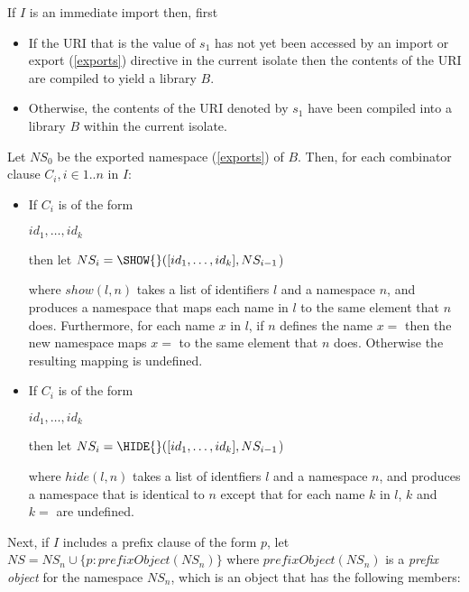 \documentclass{article}
\newcommand{\code}[1]{{\sf #1}}
\begin{document}

\LMHash{}
If $I$ is an immediate import then, first

 \begin{itemize}
 \item
If  the URI that is the value of $s_1$ has not yet been accessed by an import or export (\ref{exports}) directive  in the current isolate then the contents of the URI  are compiled to yield a library $B$. 
\item Otherwise, the contents of the URI denoted by $s_1$ have been compiled into a library $B$ within the current isolate.
\end{itemize}


\LMHash{}
Let $NS_0$ be the exported namespace (\ref{exports}) of $B$. Then, for each combinator clause $C_i, i \in 1..n$ in $I$:
\begin{itemize}
\item If $C_i$ is of the form 

\code{\SHOW{} $id_1, \ldots, id_k$} 

then let $NS_i = \SHOW{}([id_1, \ldots, id_k], NS_{i-1}$)

where $show(l,n)$ takes a list of identifiers $l$ and a namespace $n$, and produces a namespace that maps each name in $l$ to the same element that $n$ does. Furthermore, for each name $x$ in $l$, if $n$ defines the name  $x=$ then the new namespace maps $x=$ to the same element that $n$ does. Otherwise the resulting mapping is undefined.
  
\item If $C_i$ is of the form 

\code{\HIDE{} $id_1, \ldots, id_k$} 

then let $NS_i = \HIDE{}([id_1, \ldots, id_k], NS_{i-1}$) 

where $hide(l, n)$ takes a list of identfiers $l$ and a namespace $n$, and produces a namespace that is identical to $n$ except that for each name $k$ in $l$, $k$ and $k=$ are undefined. 
\end{itemize}
 
\LMHash{}
Next, if $I$ includes a prefix clause of the form \AS{} $p$, let $NS =  NS_n \cup \{p: prefixObject(NS_n)\}$ where $prefixObject(NS_n)$ is a {\em prefix object} for the namespace $NS_n$, which is an object that has the following members:
\end{document}
